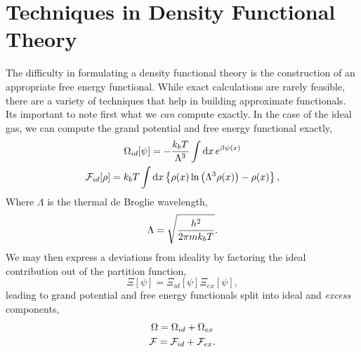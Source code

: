 \section{Techniques in Density Functional Theory} %

The difficulty in formulating a density functional theory is the construction
of an appropriate free energy functional.  While exact calculations are rarely
feasible, there are a variety of techniques that help in building approximate
functionals.  Its important to note first what we \textit{can} compute exactly.
In the case of the ideal gas, we can compute the grand potential and free
energy functional exactly,
%
\begin{gather}
    \Omega_{id}[\psi] = -\frac{k_bT}{\Lambda^{3}} 
        \int\mathrm{d}x\,e^{\beta\psi(x)} \\ 
    \mathcal{F}_{id}[\rho] = k_bT\int \mathrm{d}x
        \left\lbrace \rho(x) \ln\left(\Lambda^3\rho(x)\right) - \rho(x) \right\rbrace,
    \label{F_ideal}
\end{gather}
% 
Where $\Lambda$ is the thermal de Broglie wavelength,
%
\begin{equation}
    \Lambda = \sqrt{\frac{h^2}{2\pi mk_bT}}.
\end{equation}
%
We may then express a deviations from ideality by factoring the ideal
contribution out of the partition function,
%
\begin{equation}
    \Xi[\psi] = \Xi_{id}[\psi]\Xi_{ex}[\psi],
\end{equation}
%
leading to grand potential and free energy functionals split into ideal and
\textit{excess} components,
%
\begin{gather}
    \Omega = \Omega_{id} + \Omega_{ex} \\
    \mathcal{F} = \mathcal{F}_{id} + \mathcal{F}_{ex}.
\end{gather}

